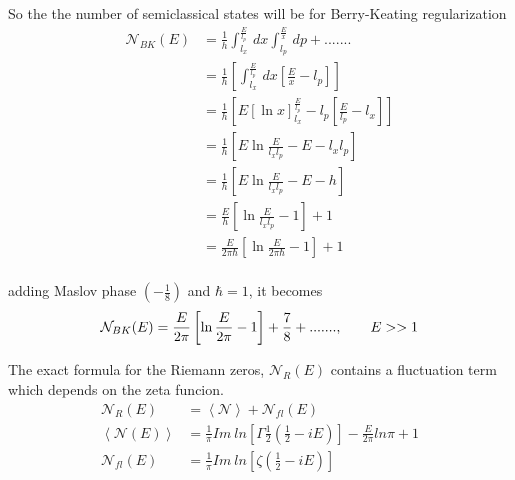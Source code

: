 \documentclass[12pt, letterpaper]{article}
\newcommand*{\1}{\hspace{1pt}}
\begin{document}
    So the the number of semiclassical states will be for Berry-Keating regularization 
    \begin{equation}
        \begin{split}
            \mathcal {N}_{BK}(E) &= \frac{1}{h}\int_{l_{x}}^{\frac{E}{l_{p}}}  \,dx \int_{l_{p}}^{\frac{E}{x}}  \,dp + ....... \\
            &= \frac{1}{h}\left[\int_{l_{x}}^{\frac{E}{l_{p}}}  \,dx \left[\frac{E}{x} - l_{p}\right] \right]  \\
            &= \frac{1}{h}\left[E\left[\ln x\right] ^{\frac{E}{l_{p}}} _{l_{x}} - l_{p}\left[\frac{E}{l_{p}} - l_{x}\right] \right]  \\
            &= \frac{1}{h}\left[E\ln \frac{E}{l_{x}l_{p}}  - E - l_{x}l_{p} \right]  \\
            &= \frac{1}{h}\left[E\ln \frac{E}{l_{x}l_{p}}  - E - h \right]  \\
            &= \frac{E}{h}\left[\ln \frac{E}{l_{x}l_{p}}  - 1 \right]  + 1 \\
            &= \frac{E}{2 \pi \hbar}\left[\ln \frac{E}{2 \pi \hbar}  - 1 \right]  + 1 \\
        \end{split}
    \end{equation}

    adding Maslov phase $(-\frac{1}{8})$ and $\hbar = 1$, it becomes 
    \begin{equation}
        \mathcal {N}_{BK}(E) = \frac{E}{2 \pi}\left[\ln \frac{E}{2\pi}  - 1 \right]  + \frac{7}{8} + .......,  \ \ \ \ \ \ E>>1\\
    \end{equation}

    The exact formula for the Riemann zeros, $\mathcal{N}_{R} (E)$ contains a fluctuation term which depends on the zeta funcion.\cite{s3}  
    \begin{equation}
        \begin{split}
            \mathcal{N}_{R} (E) &= \left\langle \mathcal{N}\right\rangle + \mathcal{N}_{fl} (E) \\
            \left\langle\mathcal{N} (E)\right\rangle &= \frac{1}{\pi} Im \ ln \left[\Gamma\frac{1}{2}\left(\frac{1}{2}-iE\right) \right] - \frac{E}{2 \pi} ln \pi + 1  \\
            \mathcal {N} _{fl} (E) &= \frac{1}{\pi} Im \ ln \left[\zeta\left(\frac{1}{2} - iE \right)\right]
        \end{split}
    \end{equation}
\end{document}
